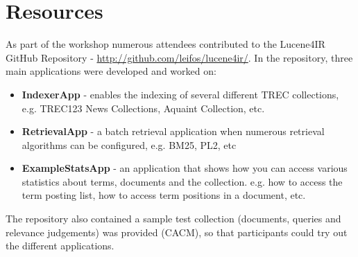 \section{Resources}
As part of the workshop numerous attendees contributed to the Lucene4IR GitHub Repository - \url{http://github.com/leifos/lucene4ir/}. In the repository, three main applications were developed and worked on:
\begin{itemize}
	\item {\bf IndexerApp} - enables the indexing of several different TREC collections, e.g. TREC123 News Collections, Aquaint Collection, etc.
	\item {\bf RetrievalApp} - a batch retrieval application when numerous retrieval algorithms can be configured, e.g. BM25, PL2, etc
	\item {\bf ExampleStatsApp} - an application that shows how you can access various statistics about terms, documents and the collection. e.g. how to access the term posting list, how to access term positions in a document, etc.
	\end{itemize}

The repository also contained a sample test collection (documents, queries and relevance judgements) was provided (CACM), so that participants could try out the different applications.

